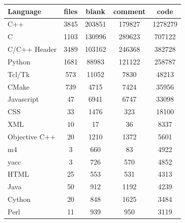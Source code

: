 \begin{appendix}
\begin{table}[htbp]
    \centering
    \caption{VTK, language statistic}
    \sffamily 
    \begin{longtable}{ l|c|c|c|c }
        \hline
        \textbf{Language}&      \textbf{files}&\textbf{blank}& \textbf{comment}& \textbf{code}\\
        \hline
        C++                                   &3845         &203851         &179827        &1278279\\
        C                                     &1103         &130996         &289623        &707122\\
        C/C++ Header                          &3489         &103162         &246368        & 382728\\
        Python                                &1681         & 88983         &121122        & 258787\\
        Tcl/Tk                                & 573         & 11052         &  7830        &  48213\\
        CMake                                 & 739         &  4715         &  7424        &  35956\\
        Javascript                            &  47         &  6941         &  6747        &  33098\\
        CSS                                   &  33         &  1476         &   323        &  18100\\
        XML                                   &  10         &    17         &    36        &   8337\\
        Objective C++                         &  20         &  1210         &  1372        &   5601\\
        m4                                    &   3         &   660         &    83        &   4922\\
        yacc                                  &   3         &   726         &   570        &   4852\\
        HTML                                  &  25         &   553         &   531        &   4313\\
        Java                                  &  50         &   912         &  1192        &   4239\\
        Cython                                &  20         &   848         &  1625        &   3484\\
        Perl                                  &  11         &   939         &   950        &   3119\\

\end{longtable}
\end{table}
\end{appendix}

